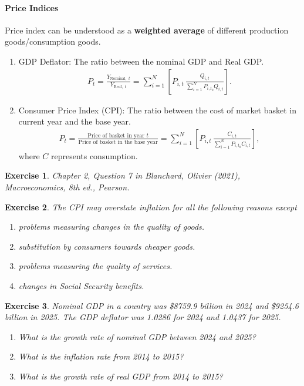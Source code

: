 \documentclass[12pt]{article}
\newtheorem{exercise}{Exercise}
\numberwithin{equation}{section}
\begin{document}
\paragraph{Price Indices}
Price index can be understood as a \textbf{weighted average} of different production goods/consumption goods.
\begin{enumerate}[label=(\arabic*)]
    \item GDP Deflator: The ratio between the nominal GDP and Real GDP.
    \begin{align*}
        P_t = \frac{Y_{\text{Nominal, }\, t}}{Y_{\text{Real, }\, t}} = \sum_{i=1}^N \left[P_{i,t}\, \frac{Q_{i,t}}{\sum_{i=1}^N P_{i,t_0}Q_{i,t}}\right].
    \end{align*}
    \item Consumer Price Index (CPI): The ratio between the cost of market basket in current year and the base year.
    \begin{align*}
        P_t = \frac{\text{Price of basket in year } t}{\text{Price of basket in the base year}} = \sum_{i=1}^N \left[P_{i,t}\, \frac{C_{i,t}}{\sum_{i=1}^N P_{i,t_0}C_{i,t}}\right],
    \end{align*}
    where $C$ represents consumption.
\end{enumerate}

\begin{exercise}
    Chapter 2, Question 7 in Blanchard, Olivier (2021), \textit{Macroeconomics}, 8th ed., Pearson.
\end{exercise}

\begin{exercise}
    The CPI may overstate inflation for all the following reasons except
    \begin{enumerate}[label=\Alph*.]
        \item problems measuring changes in the quality of goods.
        \item substitution by consumers towards cheaper goods.
        \item problems measuring the quality of services.
        \item changes in Social Security benefits.
    \end{enumerate}
\end{exercise}

\begin{exercise}
    Nominal GDP in a country was \$8759.9 billion in 2024 and \$9254.6 billion in 2025. The GDP deflator was 1.0286 for 2024 and 1.0437 for 2025.
    \begin{enumerate}[label=(\roman*)]
        \item What is the growth rate of nominal GDP between 2024 and 2025?
        \item What is the inflation rate from 2014 to 2015?
        \item What is the growth rate of real GDP from 2014 to 2015?
    \end{enumerate}
\end{exercise}
\end{document}
